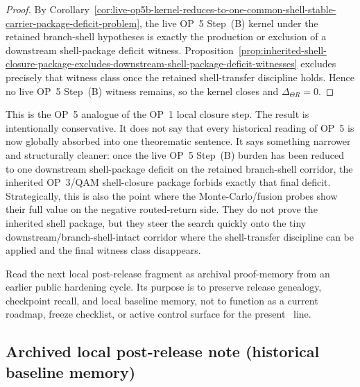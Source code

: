 \begin{proof}
By Corollary~\ref{cor:live-op5b-kernel-reduces-to-one-common-shell-stable-carrier-package-deficit-problem}, the live OP~5 Step~(B) kernel under the retained branch-shell hypotheses is exactly the production or exclusion of a downstream shell-package deficit witness. Proposition~\ref{prop:inherited-shell-closure-package-excludes-downstream-shell-package-deficit-witnesses} excludes precisely that witness class once the retained shell-transfer discipline holds. Hence no live OP~5 Step~(B) witness remains, so the kernel closes and \(\Delta_{\Theta R}=0\).
\end{proof}

\begin{remark}
\label{rem:what-sixth-op5b-sharpening-buys}
This is the OP~5 analogue of the OP~1 local closure step. The result is intentionally conservative. It does not say that every historical reading of OP~5 is now globally absorbed into one theorematic sentence. It says something narrower and structurally cleaner: once the live OP~5 Step~(B) burden has been reduced to one downstream shell-package deficit on the retained branch-shell corridor, the inherited OP~3/QAM shell-closure package forbids exactly that final deficit. Strategically, this is also the point where the Monte-Carlo/fusion probes show their full value on the negative routed-return side. They do not prove the inherited shell package, but they steer the search quickly onto the tiny downstream/branch-shell-intact corridor where the shell-transfer discipline can be applied and the final witness class disappears.
\end{remark}
\begin{remark}
Read the next local post-release fragment as archival proof-memory from an earlier public hardening cycle. Its purpose is to preserve release genealogy, checkpoint recall, and local baseline memory, not to function as a current roadmap, freeze checklist, or active control surface for the present \docversion\ line.
\end{remark}

\subsection*{Archived  local post-release note (historical baseline memory)}



